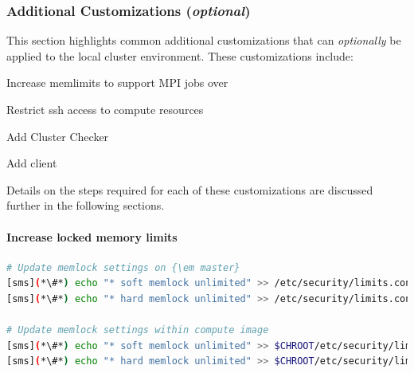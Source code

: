 \documentclass[letterpaper]{article}
\begin{document}

\subsubsection{Additional Customizations ({\em optional})} \label{sec:addl_customizations}

This section highlights common additional customizations that
can {\em optionally} be applied to the
local cluster environment. These customizations include:

\begin{itemize*}
\item Increase memlimits to support MPI jobs over \InfiniBand{}
\item Restrict ssh access to compute resources
\item Add Cluster Checker
\item Add \Lustre{} client
\end{itemize*}

\noindent Details on the steps required for each of these customizations are
discussed further in the following sections.

\paragraph{Increase locked memory limits}

 

\begin{lstlisting}[language=bash,keywords={},upquote=true]
# Update memlock settings on {\em master}
[sms](*\#*) echo "* soft memlock unlimited" >> /etc/security/limits.conf
[sms](*\#*) echo "* hard memlock unlimited" >> /etc/security/limits.conf

# Update memlock settings within compute image
[sms](*\#*) echo "* soft memlock unlimited" >> $CHROOT/etc/security/limits.conf
[sms](*\#*) echo "* hard memlock unlimited" >> $CHROOT/etc/security/limits.conf
\end{lstlisting}

\end{document}
